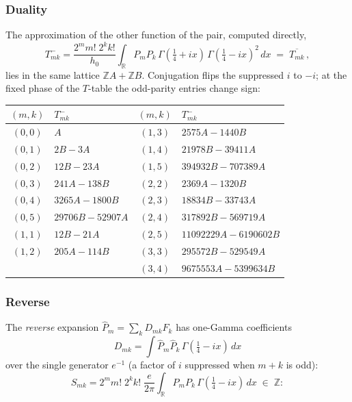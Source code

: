 \documentclass[11pt,a4paper]{article}
\theoremstyle{definition}
\newcommand{\R}{\mathbb{R}}
\newcommand{\Z}{\mathbb{Z}}
\newcommand{\G}{\Gamma}
\begin{document}
\subsubsection*{Duality}

The approximation of the other function of the pair, computed
directly,
\[
  T^-_{mk} = \frac{2^m m!\; 2^k k!}{h_0}
  \int_\R P_m P_k\, \G(\tfrac14+ix)\, \G(\tfrac14-ix)^2\, dx
  \;=\; \overline{T_{mk}}\,,
\]
lies in the same lattice $\Z A + \Z B$. Conjugation flips the
suppressed $i$ to $-i$; at the fixed phase of the $T$-table the
odd-parity entries change sign:

\begin{tcolorbox}[colback=black!5, colframe=black!5, boxrule=0pt, sharp corners]
\begin{center}
\begin{tabular}{cl@{\qquad}cl}
\toprule
$(m,k)$ & $T^-_{mk}$ & $(m,k)$ & $T^-_{mk}$ \\
\midrule
$(0,0)$ & $A$                   & $(1,3)$ & $2575A - 1440B$ \\
$(0,1)$ & $2B - 3A$             & $(1,4)$ & $21978B - 39411A$ \\
$(0,2)$ & $12B - 23A$           & $(1,5)$ & $394932B - 707389A$ \\
$(0,3)$ & $241A - 138B$         & $(2,2)$ & $2369A - 1320B$ \\
$(0,4)$ & $3265A - 1800B$       & $(2,3)$ & $18834B - 33743A$ \\
$(0,5)$ & $29706B - 52907A$     & $(2,4)$ & $317892B - 569719A$ \\
$(1,1)$ & $12B - 21A$           & $(2,5)$ & $11092229A - 6190602B$ \\
$(1,2)$ & $205A - 114B$         & $(3,3)$ & $295572B - 529549A$ \\
        &                       & $(3,4)$ & $9675553A - 5399634B$ \\
\bottomrule
\end{tabular}
\end{center}
\end{tcolorbox}

\subsubsection*{Reverse}

The \emph{reverse} expansion $\widehat P_m = \sum_k D_{mk} F_k$ has
one-Gamma coefficients
\[
  D_{mk} = \int \widehat P_m \widehat P_k\, \G(\tfrac14 - ix)\, dx
\]
over the single generator $e^{-1}$ (a factor of $i$ suppressed when
$m+k$ is odd):
\[
  S_{mk} = 2^m m!\; 2^k k!\; \frac{e}{2\pi}
  \int_\R P_m P_k\, \G(\tfrac14-ix)\, dx \;\in\; \Z :
\]
\end{document}
